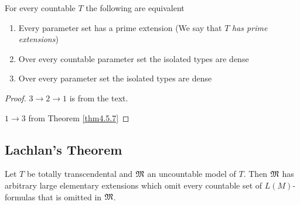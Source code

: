 \documentclass[11pt]{article}
\begin{document}
\begin{exercise}
\label{ex5.3.2}
For every countable \(T\) the following are equivalent
\begin{enumerate}
\item Every parameter set has a prime extension (We say that \(T\) \emph{has prime extensions})
\item Over every countable parameter set the isolated types are dense
\item Over every parameter set the isolated types are dense
\end{enumerate}
\end{exercise}

\begin{proof}
\(3\to 2\to 1\) is from the text.

\(1\to 3\) from Theorem \ref{thm4.5.7}
\end{proof}
\subsection{Lachlan's Theorem}
\label{sec:org2e05e50}
\begin{theorem}[Lachlan]
\label{thm5.4.1}
Let \(T\) be totally transcendental and \(\mathfrak{M}\) an uncountable model of \(T\). Then \(\mathfrak{M}\) has
arbitrary large elementary extensions which omit every countable set of \(L(M)\)-formulas that
is omitted in \(\mathfrak{M}\).
\end{theorem}
\end{document}
